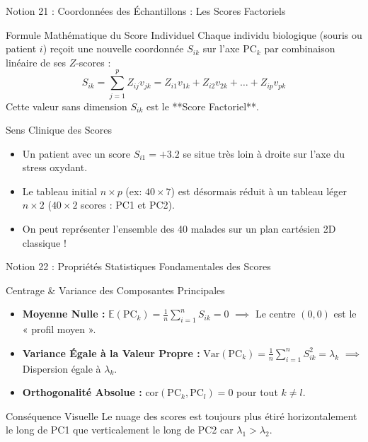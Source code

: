 \documentclass[aspectratio=169,10pt]{beamer}
\begin{document}
\begin{frame}{Notion 21 : Coordonnées des Échantillons : Les Scores Factoriels}
  \begin{conceptbox}{Formule Mathématique du Score Individuel}
    \footnotesize
    Chaque individu biologique (souris ou patient $i$) reçoit une nouvelle coordonnée $S_{ik}$ sur l'axe $\text{PC}_k$ par combinaison linéaire de ses $Z$-scores :
    \begin{equation*}
      S_{ik} = \sum_{j=1}^p Z_{ij} v_{jk} = Z_{i1} v_{1k} + Z_{i2} v_{2k} + \dots + Z_{ip} v_{pk}
    \end{equation*}
    Cette valeur sans dimension $S_{ik}$ est le **Score Factoriel**.
  \end{conceptbox}
  \vspace{1mm}
  \begin{biobox}{Sens Clinique des Scores}
    \footnotesize
    \begin{itemize}
      \item Un patient avec un score $S_{i1} = +3.2$ se situe très loin à droite sur l'axe du stress oxydant.
      \item Le tableau initial $n \times p$ (ex: $40 \times 7$) est désormais réduit à un tableau léger $n \times 2$ ($40 \times 2$ scores : PC1 et PC2).
      \item On peut représenter l'ensemble des 40 malades sur un plan cartésien 2D classique !
    \end{itemize}
  \end{biobox}
\end{frame}

\begin{frame}{Notion 22 : Propriétés Statistiques Fondamentales des Scores}
  \begin{conceptbox}{Centrage \& Variance des Composantes Principales}
    \footnotesize
    \begin{itemize}
      \item \textbf{Moyenne Nulle :} $\mathbb{E}(\text{PC}_k) = \frac{1}{n} \sum_{i=1}^n S_{ik} = 0$ \quad $\implies$ Le centre $(0,0)$ est le « profil moyen ».
      \item \textbf{Variance Égale à la Valeur Propre :} $\text{Var}(\text{PC}_k) = \frac{1}{n} \sum_{i=1}^n S_{ik}^2 = \lambda_k$ \quad $\implies$ Dispersion égale à $\lambda_k$.
      \item \textbf{Orthogonalité Absolue :} $\text{cor}(\text{PC}_k, \text{PC}_l) = 0$ pour tout $k \neq l$.
    \end{itemize}
  \end{conceptbox}
  \vspace{1mm}
  \begin{takeawaybox}{Conséquence Visuelle}
    \footnotesize
    Le nuage des scores est toujours plus étiré horizontalement le long de PC1 que verticalement le long de PC2 car $\lambda_1 > \lambda_2$.
  \end{takeawaybox}
\end{frame}
\end{document}
